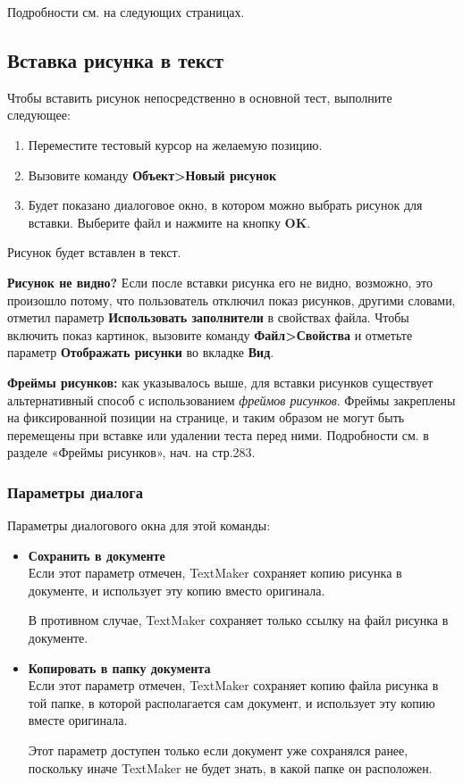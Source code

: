 \documentclass[a4paper,10pt]{article}
\begin{document}
Подробности см. на следующих страницах.

\subsection{Вставка рисунка в текст}
Чтобы вставить рисунок непосредственно в основной тест, выполните следующее:

\begin{enumerate}
 \item Переместите тестовый курсор на желаемую позицию.
 \item Вызовите команду \textbf{Объект>Новый рисунок}
 \item Будет показано диалоговое окно, в котором можно выбрать рисунок для вставки. Выберите файл и нажмите на кнопку \textbf{OK}.
\end{enumerate}

Рисунок будет вставлен в текст.

\textbf{Рисунок не видно?} Если после вставки рисунка его не видно, возможно, это произошло потому, что пользователь отключил показ рисунков, другими словами, отметил параметр \textbf{Использовать заполнители} в свойствах файла. Чтобы включить показ картинок, вызовите команду \textbf{Файл>Свойства} и отметьте параметр \textbf{Отображать рисунки} во вкладке \textbf{Вид}.

\textbf{Фреймы рисунков:} как указывалось выше, для вставки рисунков существует альтернативный способ с использованием \textit{фреймов рисунков}. Фреймы закреплены на фиксированной позиции на странице, и таким образом не могут быть перемещены при вставке или удалении теста перед ними. Подробности см. в разделе «Фреймы рисунков», нач. на стр.283.

\subsubsection{Параметры диалога}
Параметры диалогового окна для этой команды:
\begin{itemize}
 \item \textbf{Сохранить в документе}\\
 Если этот параметр отмечен, TextMaker сохраняет копию рисунка в документе, и использует эту копию вместо оригинала.
 
 В противном случае, TextMaker сохраняет только ссылку на файл рисунка в документе.
 \item \textbf{Копировать в папку документа}\\
 Если этот параметр отмечен, TextMaker сохраняет копию файла рисунка в той папке, в которой располагается сам документ, и использует эту копию вместе оригинала.
 
 Этот параметр доступен только если документ уже сохранялся ранее, поскольку иначе TextMaker не будет знать, в какой папке он расположен.
\end{itemize}
\end{document}
